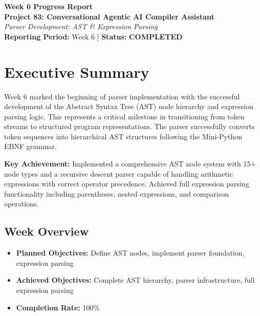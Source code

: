 \documentclass[a4paper,11pt]{article}
\newcommand{\statusgood}[1]{\colorbox{green!20}{\textbf{#1}}}
\begin{document}
\begin{center}
    {\huge \textbf{Week 6 Progress Report}} \\
    \vspace{3mm}
    {\large \textbf{Project 83: Conversational Agentic AI Compiler Assistant}} \\
    \vspace{2mm}
    \textit{Parser Development: AST \& Expression Parsing} \\
    \vspace{2mm}
    \textbf{Reporting Period:} Week 6 | \textbf{Status:} \statusgood{COMPLETED}
\end{center}

\vspace{5mm}

\section{Executive Summary}

Week 6 marked the beginning of parser implementation with the successful development of the Abstract Syntax Tree (AST) node hierarchy and expression parsing logic. This represents a critical milestone in transitioning from token streams to structured program representations. The parser successfully converts token sequences into hierarchical AST structures following the Mini-Python EBNF grammar.

\textbf{Key Achievement:} Implemented a comprehensive AST node system with 15+ node types and a recursive descent parser capable of handling arithmetic expressions with correct operator precedence. Achieved full expression parsing functionality including parentheses, nested expressions, and comparison operations.

\subsection{Week Overview}

\begin{itemize}[leftmargin=*]
    \item \textbf{Planned Objectives:} Define AST nodes, implement parser foundation, expression parsing
    \item \textbf{Achieved Objectives:} Complete AST hierarchy, parser infrastructure, full expression parsing
    \item \textbf{Completion Rate:} 100\%
\end{itemize}
\end{document}
